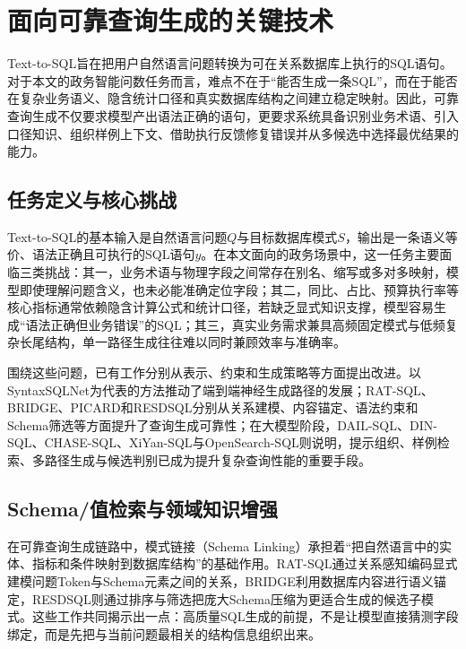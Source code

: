 \section{面向可靠查询生成的关键技术}

Text-to-SQL旨在把用户自然语言问题转换为可在关系数据库上执行的SQL语句\cite{liu2025survey,kim2024text2sql_survey}。对于本文的政务智能问数任务而言，难点不在于“能否生成一条SQL”，而在于能否在复杂业务语义、隐含统计口径和真实数据库结构之间建立稳定映射。因此，可靠查询生成不仅要求模型产出语法正确的语句，更要求系统具备识别业务术语、引入口径知识、组织样例上下文、借助执行反馈修复错误并从多候选中选择最优结果的能力\cite{王昊奋2024}。

\subsection{任务定义与核心挑战}

Text-to-SQL的基本输入是自然语言问题$Q$与目标数据库模式$S$，输出是一条语义等价、语法正确且可执行的SQL语句$y$\cite{liu2025survey}。在本文面向的政务场景中，这一任务主要面临三类挑战：其一，业务术语与物理字段之间常存在别名、缩写或多对多映射，模型即使理解问题含义，也未必能准确定位字段；其二，同比、占比、预算执行率等核心指标通常依赖隐含计算公式和统计口径，若缺乏显式知识支撑，模型容易生成“语法正确但业务错误”的SQL；其三，真实业务需求兼具高频固定模式与低频复杂长尾结构，单一路径生成往往难以同时兼顾效率与准确率\cite{王昊奋2024,沈宇2025}。

围绕这些问题，已有工作分别从表示、约束和生成策略等方面提出改进。以SyntaxSQLNet为代表的方法推动了端到端神经生成路径的发展\cite{yu2018syntaxsqlnet}；RAT-SQL、BRIDGE、PICARD和RESDSQL分别从关系建模、内容锚定、语法约束和Schema筛选等方面提升了查询生成可靠性\cite{wang2020ratsql,lin2020bridge,scholak2021picard,li2023resdsql}；在大模型阶段，DAIL-SQL、DIN-SQL、CHASE-SQL、XiYan-SQL与OpenSearch-SQL则说明，提示组织、样例检索、多路径生成与候选判别已成为提升复杂查询性能的重要手段\cite{gao2024text2sql,pourreza2023dinsql,pourreza2024chase,gao2024xiyan,xie2025opensearch}。

\subsection{Schema/值检索与领域知识增强}

在可靠查询生成链路中，模式链接（Schema Linking）承担着“把自然语言中的实体、指标和条件映射到数据库结构”的基础作用。RAT-SQL\cite{wang2020ratsql}通过关系感知编码显式建模问题Token与Schema元素之间的关系，BRIDGE\cite{lin2020bridge}利用数据库内容进行语义锚定，RESDSQL\cite{li2023resdsql}则通过排序与筛选把庞大Schema压缩为更适合生成的候选子模式。这些工作共同揭示出一点：高质量SQL生成的前提，不是让模型直接猜测字段绑定，而是先把与当前问题最相关的结构信息组织出来。

